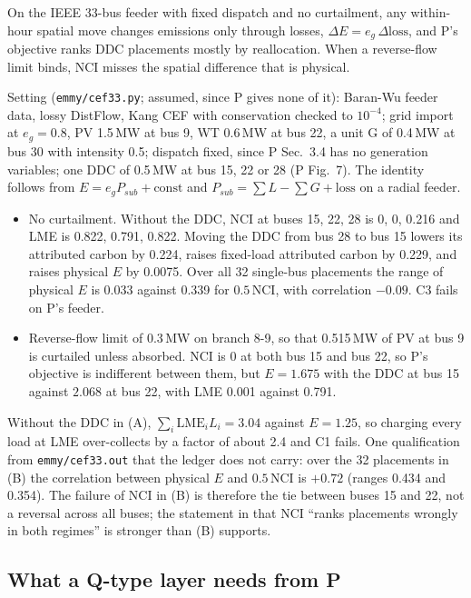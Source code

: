 \documentclass{article}
\begin{document}
\begin{claim}
On the IEEE 33-bus feeder with fixed dispatch and no curtailment, any within-hour spatial move changes emissions only through losses, \(\Delta E=e_g\,\Delta\mathrm{loss}\), and P's objective ranks DDC placements mostly by reallocation. When a reverse-flow limit binds, NCI misses the spatial difference that is physical. 
\end{claim}

Setting (\texttt{emmy/cef33.py}; assumed, since P gives none of it): Baran-Wu feeder data, lossy DistFlow, Kang CEF with conservation checked to \(10^{-4}\); grid import at \(e_g=0.8\), PV 1.5\,MW at bus 9, WT 0.6\,MW at bus 22, a unit G of 0.4\,MW at bus 30 with intensity 0.5; dispatch fixed, since P Sec.~3.4 has no generation variables; one DDC of 0.5\,MW at bus 15, 22 or 28 (P Fig.~7). The identity follows from \(E=e_gP_{sub}+\text{const}\) and \(P_{sub}=\sum L-\sum G+\text{loss}\) on a radial feeder.
\begin{itemize}
\item[(A)] No curtailment. Without the DDC, NCI at buses 15, 22, 28 is 0, 0, 0.216 and LME is 0.822, 0.791, 0.822. Moving the DDC from bus 28 to bus 15 lowers its attributed carbon by 0.224, raises fixed-load attributed carbon by 0.229, and raises physical \(E\) by 0.0075. Over all 32 single-bus placements the range of physical \(E\) is 0.033 against 0.339 for \(0.5\,\mathrm{NCI}\), with correlation \(-0.09\). C3 fails on P's feeder.
\item[(B)] Reverse-flow limit of 0.3\,MW on branch 8-9, so that 0.515\,MW of PV at bus 9 is curtailed unless absorbed. NCI is 0 at both bus 15 and bus 22, so P's objective is indifferent between them, but \(E=1.675\) with the DDC at bus 15 against \(2.068\) at bus 22, with LME 0.001 against 0.791.
\end{itemize}
Without the DDC in (A), \(\sum_i\mathrm{LME}_iL_i=3.04\) against \(E=1.25\), so charging every load at LME over-collects by a factor of about 2.4 and C1 fails. One qualification from \texttt{emmy/cef33.out} that the ledger does not carry: over the 32 placements in (B) the correlation between physical \(E\) and \(0.5\,\mathrm{NCI}\) is \(+0.72\) (ranges 0.434 and 0.354). The failure of NCI in (B) is therefore the tie between buses 15 and 22, not a reversal across all buses; the statement in  that NCI ``ranks placements wrongly in both regimes'' is stronger than (B) supports.

\subsection{What a Q-type layer needs from P}
\end{document}
